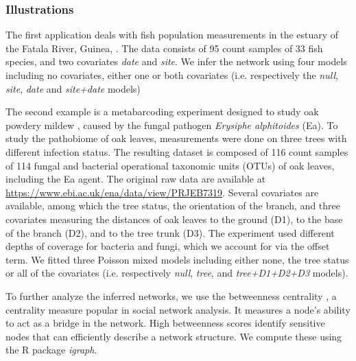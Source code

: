  \subsubsection{Illustrations} \label{sec:datasets}
 
The first application deals with fish population measurements in the estuary of the Fatala River, Guinea, \citep[][available in the R package \textit{ade4}]{baran1995dynamique}. The data consists of 95 count samples of 33 fish species, and two covariates {\it date} and {\it site}. 
We infer the network using four models including no covariates, either one  or both covariates (i.e. respectively the \textit{null}, \textit{site}, \textit{date} and \textit{site+date} models)

The second example is a metabarcoding experiment designed to study oak powdery mildew \citep{jakuch}, caused by the fungal pathogen \textit{Erysiphe alphitoides} (Ea). To study the pathobiome of oak leaves, measurements were done on three trees with different infection status. The resulting dataset is composed of 116 count samples of 114 fungal and bacterial  operational taxonomic units (OTUs) of oak leaves, including the Ea agent.  The original raw data are available at \url{https://www.ebi.ac.uk/ena/data/view/PRJEB7319}. Several covariates are available, among which the tree status, the orientation of the branch, and three covariates measuring the distances of oak leaves to the ground (D1), to the base of the branch (D2), and to the tree trunk (D3). The experiment used different depths of coverage for bacteria and fungi, which we account for via the offset term. We fitted three Poisson mixed models including either none, the tree status or all of the covariates (i.e. respectively \textit{null}, \textit{tree}, and \textit{tree+D1+D2+D3} models).

To further analyze the inferred networks, we use the betweenness  centrality \citep{centrality}, a centrality measure popular in social network analysis. It measures a node's ability to act as a bridge in the network. High betweenness scores  identify sensitive nodes that can efficiently describe a network structure. We compute these using the R package \textit{igraph}.




